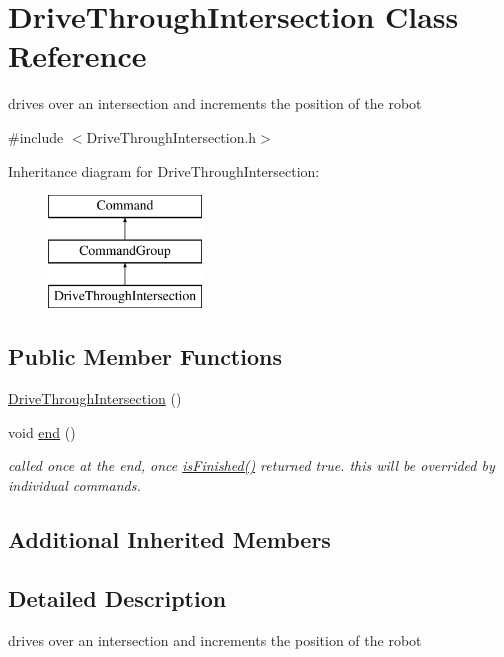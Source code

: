 \hypertarget{classDriveThroughIntersection}{\section{Drive\-Through\-Intersection Class Reference}
\label{classDriveThroughIntersection}
}


drives over an intersection and increments the position of the robot  




{\ttfamily \#include $<$Drive\-Through\-Intersection.\-h$>$}

Inheritance diagram for Drive\-Through\-Intersection\-:\begin{figure}[H]
\begin{center}
\leavevmode
\includegraphics[height=3.000000cm]{classDriveThroughIntersection}
\end{center}
\end{figure}
\subsection*{Public Member Functions}
\begin{DoxyCompactItemize}
\item 
\hyperlink{classDriveThroughIntersection_ab294711ce88640b5ee19fc0c609e0fbd}{Drive\-Through\-Intersection} ()
\item 
void \hyperlink{classDriveThroughIntersection_a5498f89533f3451cc2aa43ca57b763f4}{end} ()
\begin{DoxyCompactList}\small\item\em called once at the end, once \hyperlink{classCommandGroup_a96807a2763adf9e21ebf2cb9e3574e3c}{is\-Finished()} returned true. this will be overrided by individual commands. \end{DoxyCompactList}\end{DoxyCompactItemize}
\subsection*{Additional Inherited Members}


\subsection{Detailed Description}
drives over an intersection and increments the position of the robot 

